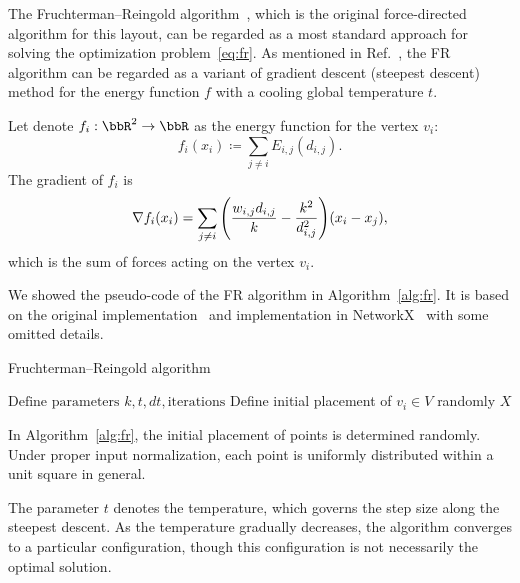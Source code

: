 \documentclass[dvipdfmx,journal]{IEEEtran}
\newcommand{\defeq}{\coloneqq}
\begin{document}
The Fruchterman--Reingold algorithm~\cite{fruchtermanGraphDrawingForcedirected1991}, which is the original force-directed algorithm for this layout, can be regarded as a most standard approach for solving the optimization problem~\eqref{eq:fr}.
As mentioned in Ref.~\cite{tunkelang1999numerical}, the FR algorithm can be regarded as a variant of gradient descent (steepest descent) method for the energy function $f$ with a cooling global temperature $t$.

Let denote $f_i: \bbR^2 \to \bbR$ as the energy function for the vertex $v_i$:
\begin{equation*}
  f_i(x_i) \defeq \sum_{j \neq i} E_{i,j}(d_{i,j}).
\end{equation*}
The gradient of $f_i$ is
\begin{equation}\label{eq:gradientFi}
  \nabla f_i(x_i) = \sum_{j \neq i} \qty(\frac{w_{i,j}d_{i,j}}{k} - \frac{k^2}{d_{i,j}^2}) (x_i-x_j),
\end{equation}
which is the sum of forces acting on the vertex $v_i$.

We showed the pseudo-code of the FR algorithm in Algorithm~\ref{alg:fr}. It is based on the original implementation~\cite{fruchtermanGraphDrawingForcedirected1991} and implementation in NetworkX~\cite{hagberg2008exploring} with some omitted details.

\begin{algorithm}[ht]
  \caption{Fruchterman--Reingold algorithm}
  \label{alg:fr}

  $\text{Define parameters } k, t, dt, \text{iterations}$\;
  Define initial placement of $v_i \in V$ randomly\;
  \Return $X$\;
\end{algorithm}

In Algorithm~\ref{alg:fr}, the initial placement of points is determined randomly. Under proper input normalization, each point is uniformly distributed within a unit square in general.

The parameter $t$ denotes the temperature, which governs the step size along the steepest descent. As the temperature gradually decreases, the algorithm converges to a particular configuration, though this configuration is not necessarily the optimal solution.
\end{document}
